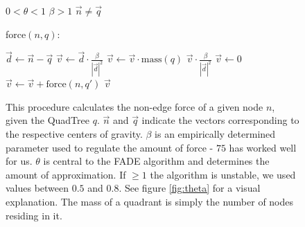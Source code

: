 \documentclass[a4paper,11pt,titlepage]{article}
\begin{document}
\begin{figure}[ht]
  \begin{minipage}[b]{0.5\linewidth}
    \begin{algorithmic}
      \REQUIRE $0 < \theta < 1$
      \REQUIRE $\beta > 1$
      \REQUIRE $\vec{n} \neq \vec{q}$
    \end{algorithmic}
    force$(n, q)$:
    \begin{algorithmic}
      \STATE $\vec{d} \gets \vec{n} - \vec{q}$
      \STATE $\vec{v} \gets \vec{d} \cdot \frac{\beta}{|{\vec{d}}|^2}$
      \STATE $\vec{v} \gets \vec{v} \cdot \textrm{mass}(q)$
      \RETURN $\vec{v} \cdot \frac{\beta}{|{\vec{d}}|^2}$
      \ELSE
      \STATE $\vec{v} \gets 0$
      \STATE $\vec{v} \gets \vec{v} + \textrm{force}(n, q')$
      \ENDFOR
      \RETURN $\vec{v}$
      \ENDIF
    \end{algorithmic}
    \caption{This procedure calculates the non-edge force of a given node $n$, given the
      QuadTree $q$. $\vec{n}$ and $\vec{q}$ indicate the vectors corresponding to the
      respective centers of gravity. $\beta$ is an empirically determined parameter used
      to regulate the amount of force - $75$ has worked well for us. $\theta$ is central
      to the FADE algorithm and determines the amount of approximation. If $\geq 1$ the
      algorithm is unstable, we used values between $0.5$ and $0.8$. See figure
      \ref{fig:theta} for a visual explanation. The mass of a quadrant is simply the
      number of nodes residing in it. }
    \label{proc:FADE}
  \end{minipage}
  \hspace{10pt}
  \begin{minipage}[b]{0.5\linewidth}
    \centering
\end{minipage}
\end{figure}
\end{document}
